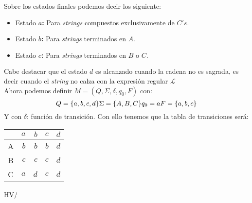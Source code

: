 \documentclass[spanish, fleqn]{article}
\begin{document}
\begin{enumerate}
			Sobre los estados finales podemos decir los siguiente:
			\begin{itemize}
				\item
					Estado \textbf{\(a\):} Para \emph{strings} compuestos
					exclusivamente de \(C's\).
				\item
					Estado \textbf{\(b\):} Para \emph{strings} terminados en 
					\(A\).
				\item
					Estado \textbf{\(c\):} Para \emph{strings} terminados en
					\(B\) o \(C\).
			\end{itemize}
			Cabe destacar que el estado \(d\) es alcanzado cuando la cadena no
			es sagrada, es decir cuando el \emph{string} no calza con la
			expresión regular \(\mathcal{L}\)\\
			Ahora podemos definir \(M = ( Q, \Sigma, \delta, q_{0}, F) \) con:
			\begin{equation*}
				Q = \{a,b,c,d\} \\
				\Sigma = \{A,B,C\} \\
				q_{0} = a \\
				F = \{a,b,c\} \\
			\end{equation*}
			Y con \(\delta\): función de transición. Con ello tenemos que la 
			tabla de transiciones será:
			  \begin{center}
				\begin{tabular}{|c|r|r|r|r|}
					\hline
					\backslashbox{entrada}{estado} & 
					\(a\)	& \(b\)	& \(c\)	& \(d\)
					\\\hline
					A	& \(b\)	& \(b\)	& \(b\)	& \(d\)	
					\\\hline
					B	& \(c\)	& \(c\)	& \(c\)	& \(d\)	
					\\\hline
					C	& \(a\)	& \(d\)	& \(c\)	& \(d\)	
					\\\hline
				\end{tabular}
			  \end{center}

	\end{enumerate}

\vfill\hfill HV/\LaTeXe
\end{document}
